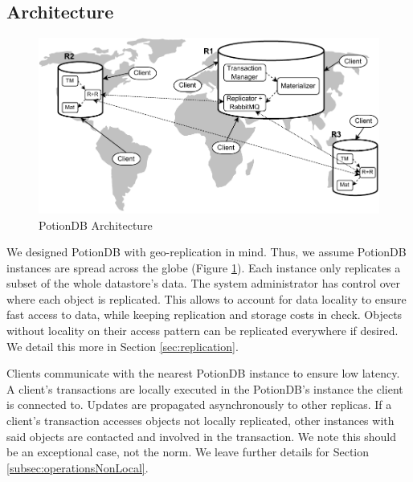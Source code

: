 \documentclass[sigconf, nonacm]{acmart}
\newcommand{\carla}[1]{\nbnote{Carla}{green}{#1}}
\begin{document}
\subsection{Architecture}
\label{subsec:architecture}


\begin{figure}
	\centering
	\includegraphics[width=\linewidth]{PotionDBArch}
	\caption{PotionDB Architecture}
	\label{fig:arch}
\end{figure}

We designed PotionDB with geo-replication in mind.
Thus, we assume PotionDB instances are spread across the globe (Figure \ref{fig:arch}).
Each instance only replicates a subset of the whole datastore's data.
The system administrator has control over where each object is replicated.
This allows to account for data locality to ensure fast access to data, while keeping replication and storage costs in check.
Objects without locality on their access pattern can be replicated everywhere if desired.
We detail this more in Section \ref{sec:replication}.

Clients communicate with the nearest PotionDB instance to ensure low latency.
A client's transactions are locally executed in the PotionDB's instance the client is connected to.
Updates are propagated asynchronously to other replicas.
If a client's transaction accesses objects not locally replicated, other instances with said objects are contacted and involved in the transaction.
We note this should be an exceptional case, not the norm.
We leave further details for Section \ref{subsec:operationsNonLocal}.
\end{document}
